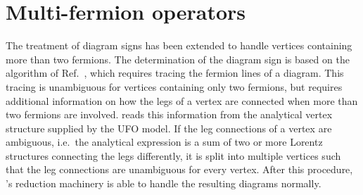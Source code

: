 \section{Multi-fermion operators} \label{sec:four-fermion}
The treatment of diagram signs has been extended to handle vertices containing more than two fermions. The determination of the diagram sign is based on the algorithm of Ref.~\cite{Denner:1992me}, which requires tracing the fermion lines of a diagram. This tracing is unambiguous for vertices containing only two fermions, but requires additional information on how the legs of a vertex are connected when more than two fermions are involved. \gosam reads this information from the analytical vertex structure supplied by the UFO model. If the leg connections of a vertex are ambiguous, i.e.\ the analytical expression is a sum of two or more Lorentz structures connecting the legs differently, it is split into multiple vertices such that the leg connections are unambiguous for every vertex. After this procedure, \gosam's reduction machinery is able to handle the resulting diagrams normally.


